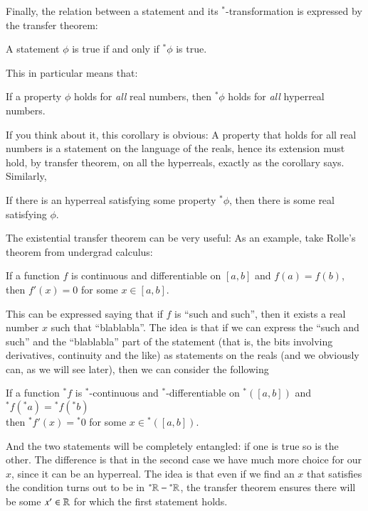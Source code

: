 \documentclass[adraft, copyright,creativecommons,sharealike,noncommercial]{Preambles/eptcs}
\newcommand{\nstar}{{^*}}
\begin{document}
Finally, the relation between a statement and its $\nstar$-transformation is expressed by the transfer theorem:
\begin{theorem}
	A statement $\phi$ is true if and only if $\nstar \phi$ is true.
\end{theorem}
%
This in particular means that:
\begin{theorem}
	If a property $\phi$ holds for \emph{all} real numbers, then $\nstar \phi$ holds for \emph{all} hyperreal numbers.
\end{theorem}
%
If you think about it, this corollary is obvious: A property that holds for all real numbers is a statement on the language of the reals, hence its extension must hold, by transfer theorem, on all the hyperreals, exactly as the corollary says. Similarly,
\begin{theorem}
	If there is an hyperreal satisfying some property $\nstar \phi$, then there is some real satisfying $\phi$.
\end{theorem}
%
\begin{example}
	The existential transfer theorem can be very useful: As an example, take Rolle's theorem from undergrad calculus:
	\begin{center}
		If a function $f$ is continuous and differentiable on $[a,b]$ and $f(a) = f(b)$, then $f'(x) = 0$ for some $x \in [a,b]$.
	\end{center}
	This can be expressed saying that if $f$ is ``such and such'', then it exists a real number $x$ such that ``blablabla''. The idea is that if we can express the ``such and such'' and the ``blablabla'' part of the statement (that is, the bits involving derivatives, continuity and the like) as statements on the reals (and we obviously can, as we will see later), then we can consider the following
	\begin{center}
		If a function $\nstar f$ is $\nstar$-continuous and $\nstar$-differentiable on $\nstar([ a,b])$ and $\nstar f(\nstar a) = \nstar f(\nstar b)$\\
		then $\nstar f'(x) = \nstar 0$ for some $x \in \nstar([ a,b])$.
	\end{center}
	And the two statements will be completely entangled: if one is true so is the other. The difference is that in the second case we have much more choice for our $x$, since it can be an hyperreal. The idea is that even if we find an $x$ that satisfies the condition turns out to be in $\nstar \reals - \nstar \reals$, the transfer theorem ensures there will be some $x' \in \mathbb{R}$ for which the first statement holds.
\end{example}
\end{document}
